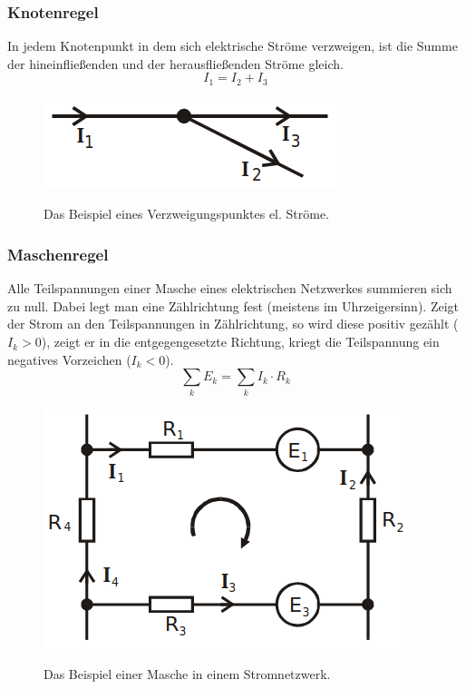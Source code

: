 \documentclass[titlepage = firstcover]{scrartcl}
\begin{document}
          \subsubsection{Knotenregel}
            In jedem Knotenpunkt in dem sich elektrische Ströme verzweigen, ist die Summe der hineinfließenden und der herausfließenden Ströme gleich.
            \begin{equation}
              I_1 = I_2 + I_3
            \end{equation}
            \begin{figure}[h]
              \centering
              \caption{Das Beispiel eines Verzweigungspunktes el. Ströme.}
              \includegraphics[width = 0.4\linewidth]{Kirchhoff_1.png}
              \label{fig:kirchhoff1}
            \end{figure}
            \FloatBarrier

          \subsubsection{Maschenregel}
            Alle Teilspannungen einer Masche eines elektrischen Netzwerkes summieren sich zu null. Dabei legt man eine Zählrichtung fest (meistens im Uhrzeigersinn). Zeigt der Strom
            an den Teilspannungen in Zählrichtung, so wird diese positiv gezählt ($I_k > 0$), zeigt er in die entgegengesetzte Richtung, kriegt die Teilspannung ein negatives
            Vorzeichen ($I_k < 0$).
            \begin{equation}
              \sum_k E_k = \sum_k I_k \cdot R_k
            \end{equation}
            \begin{figure}[h]
              \centering
              \caption{Das Beispiel einer Masche in einem Stromnetzwerk.}
              \includegraphics[width = 0.4\linewidth]{Kirchhoff_2.png}
              \label{fig:kirchhoff2}
            \end{figure}
            \FloatBarrier
\end{document}
